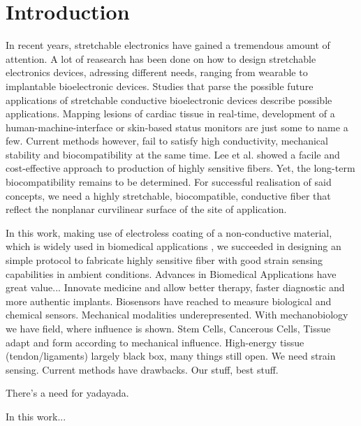 \section{Introduction}

In recent years, stretchable electronics have gained a tremendous amount of attention. \cite{Cherenack, Lee} A lot of reasearch has been done on how to design stretchable electronics devices, adressing different needs, ranging from wearable to implantable bioelectronic devices. Studies that parse the possible future applications of stretchable conductive bioelectronic devices describe possible applications. Mapping lesions of cardiac tissue in real-time, development of a human-machine-interface or skin-based status monitors are just some to name a few. \cite{Hochberg,Kim} Current methods however, fail to satisfy high conductivity, mechanical stability and biocompatibility at the same time. Lee et al. \cite{Lee} showed a facile and cost-effective approach to production of highly sensitive fibers. Yet, the long-term biocompatibility remains to be determined. For successful realisation of said concepts, we need a highly stretchable, biocompatible, conductive fiber that reflect the nonplanar curvilinear surface of the site of application.

In this work, making use of electroless coating of a non-conductive material, which is widely used in biomedical applications \cite{Pinchuk}, we succeeded in designing an simple protocol to fabricate  highly sensitive fiber with good strain sensing capabilities in ambient conditions.
Advances in Biomedical Applications have great value... Innovate medicine and allow better therapy, faster diagnostic and more authentic implants. Biosensors have reached to measure biological and chemical sensors. Mechanical modalities underepresented. With mechanobiology we have field, where influence is shown. Stem Cells, Cancerous Cells, Tissue adapt and form according to mechanical influence. High-energy tissue (tendon/ligaments) largely black box, many things still open. We need strain sensing. Current methods have drawbacks. Our stuff, best stuff. 

There's a need for yadayada.

In this work...